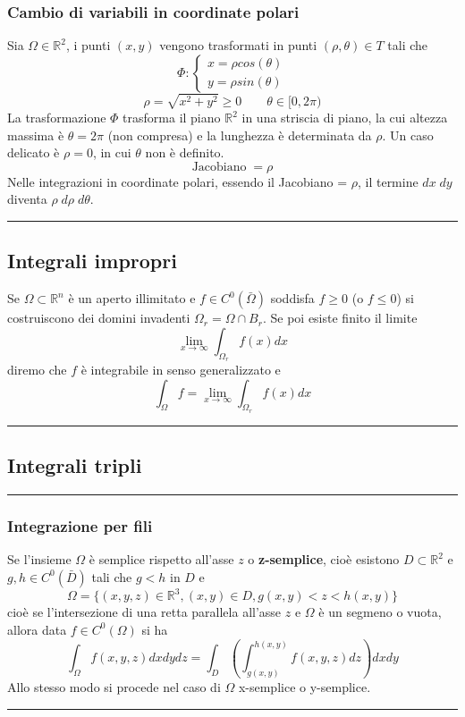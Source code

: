 \subsubsection*{Cambio di variabili in coordinate polari}
Sia $\Omega \in \mathbb{R}^2$, i punti $(x,y)$ vengono trasformati in punti $(\rho, \theta) \in T$ tali che
\[
    \Phi : \begin{cases}
        x = \rho cos(\theta)\\
        y =\rho sin(\theta)
    \end{cases}
\]
\[
    \rho = \sqrt{x^2 +y^2} \geq 0 \quad \quad \theta \in[0, 2\pi)
\]
La trasformazione $\Phi$ trasforma il piano $\mathbb{R}^2$ in una striscia di piano, la cui altezza massima è $\theta = 2\pi$ (non compresa) e la lunghezza è determinata da $\rho$.\newline
Un caso delicato è $\rho = 0$, in cui $\theta$ non è definito.\newline
\[
    \text{Jacobiano}\;= \rho
\]
Nelle integrazioni in coordinate polari, essendo il Jacobiano = $\rho$, il termine $dx \; dy$ diventa $\rho \; d \rho \; d \theta$.\newline
\rule{\textwidth}{2pt}
\subsection*{Integrali impropri}
Se $\Omega \subset \mathbb{R}^n$ è un aperto illimitato e $f \in C^0(\bar{\Omega})$ soddisfa $f \geq 0$ (o $f\leq 0$) si costruiscono dei domini invadenti $\Omega_r = \Omega \cap B_r$. Se poi esiste finito il limite 
\[
    \lim_{x\rightarrow \infty} \int_{\Omega_r} f(x) dx
\]
diremo che $f$ è integrabile in senso generalizzato e
\[
    \int_\Omega f = \lim_{x\rightarrow \infty} \int_{\Omega_r} f(x) dx
\]
\rule{\textwidth}{2pt}
\subsection*{Integrali tripli}
\rule{\textwidth}{0,4pt}
\subsubsection*{Integrazione per fili}
Se l'insieme $\Omega$ è semplice rispetto all'asse $z$ o \textbf{z-semplice}, cioè esistono $D \subset \mathbb{R}^2$ e $g,h \in C^0(\bar{D})$ tali che $g<h$ in $D$ e
\[
    \Omega = \{(x,y,z) \in \mathbb{R}^3, (x,y)\in D, g(x,y)<z<h(x,y)\}
\]
cioè se l'intersezione di una retta parallela all'asse $z$ e $\Omega$ è un segmeno o vuota, allora data $f \in C^0(\Omega)$ si ha
\[
    \int_\Omega f(x,y,z) dxdydz = \int_D\left(\int_{g(x,y)}^{h(x,y)}f(x,y,z) dz\right)dxdy
\] 
Allo stesso modo si procede nel caso di $\Omega$ x-semplice o y-semplice.\newline
\rule{\textwidth}{0,4pt}
